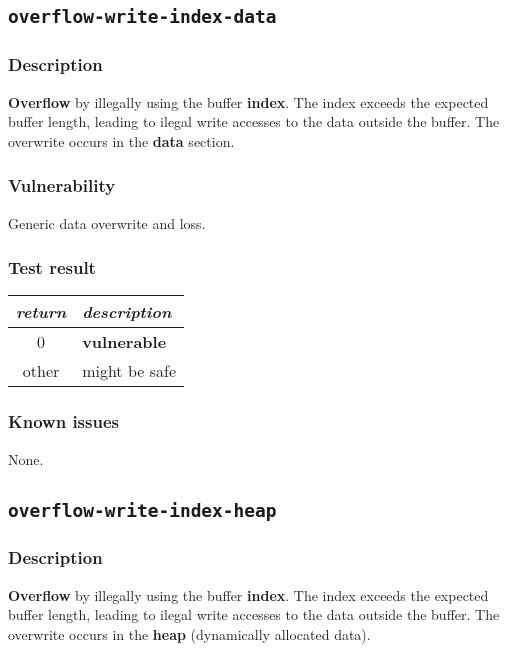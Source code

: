 \documentclass[a4paper]{book}
\begin{document}
\newpage

\subsection{\texttt{overflow-write-index-data}}\label{test-overflow-write-index-data}

\subsubsection{Description}

\textbf{Overflow} by illegally using the buffer \textbf{index}.
The index exceeds the expected buffer length,
leading to ilegal write accesses to the data outside the buffer.
The overwrite occurs in the \textbf{data} section.

\subsubsection{Vulnerability}
Generic data overwrite and loss.

\subsubsection{Test result}

\begin{tabular}{cl}
  \toprule
  \emph{return}  & \emph{description} \\
  \midrule
  0              & \textbf{vulnerable} \\
  other          & might be safe \\
  \bottomrule
\end{tabular}

\subsubsection{Known issues}

None.

\newpage

\subsection{\texttt{overflow-write-index-heap}}\label{test-overflow-write-index-heap}

\subsubsection{Description}

\textbf{Overflow} by illegally using the buffer \textbf{index}.
The index exceeds the expected buffer length,
leading to ilegal write accesses to the data outside the buffer.
The overwrite occurs in the \textbf{heap} (dynamically allocated data).
\end{document}
